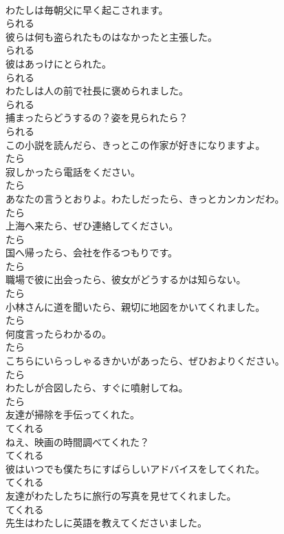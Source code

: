 \documentclass[8pt]{extreport}
\begin{document}
\begin{CJK}{UTF8}{min}
\\	わたしは毎朝父に早く起こされます。	
\\	られる
\\	彼らは何も盗られたものはなかったと主張した。	
\\	られる
\\	彼はあっけにとられた。	
\\	られる
\\	わたしは人の前で社長に褒められました。	
\\	られる
\\	捕まったらどうするの？姿を見られたら？	
\\	られる
\\	この小説を読んだら、きっとこの作家が好きになりますよ。	
\\	たら
\\	寂しかったら電話をください。	
\\	たら
\\	あなたの言うとおりよ。わたしだったら、きっとカンカンだわ。	
\\	たら
\\	上海へ来たら、ぜひ連絡してください。	
\\	たら
\\	国へ帰ったら、会社を作るつもりです。	
\\	たら
\\	職場で彼に出会ったら、彼女がどうするかは知らない。	
\\	たら
\\	小林さんに道を聞いたら、親切に地図をかいてくれました。	
\\	たら
\\	何度言ったらわかるの。	
\\	たら
\\	こちらにいらっしゃるきかいがあったら、ぜひおよりください。	
\\	たら
\\	わたしが合図したら、すぐに噴射してね。	
\\	たら
\\	友達が掃除を手伝ってくれた。	
\\	てくれる
\\	ねえ、映画の時間調べてくれた？	
\\	てくれる
\\	彼はいつでも僕たちにすばらしいアドバイスをしてくれた。	
\\	てくれる
\\	友達がわたしたちに旅行の写真を見せてくれました。	
\\	てくれる
\\	先生はわたしに英語を教えてくださいました。	

\end{CJK}
\end{document}
